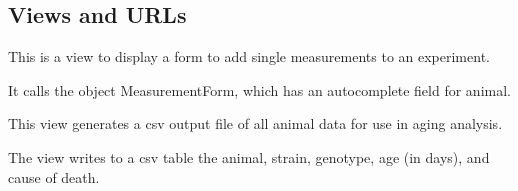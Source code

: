 \documentclass[letterpaper,10pt,english]{sphinxmanual}
\begin{document}
\subsection{Views and URLs}
\label{api:id1}\label{api:module-mousedb.data.views}

\begin{fulllineitems}
\label{api:mousedb.data.views.add_measurement}
This is a view to display a form to add single measurements to an experiment.

It calls the object MeasurementForm, which has an autocomplete field for animal.

\end{fulllineitems}



\begin{fulllineitems}
\label{api:mousedb.data.views.aging_csv}
This view generates a csv output file of all animal data for use in aging analysis.

The view writes to a csv table the animal, strain, genotype, age (in days), and cause of death.

\end{fulllineitems}



\begin{fulllineitems}
\label{api:mousedb.data.views.experiment_detail}
\end{fulllineitems}



\begin{fulllineitems}
\label{api:mousedb.data.views.experiment_detail_all}
\end{fulllineitems}


\end{document}
